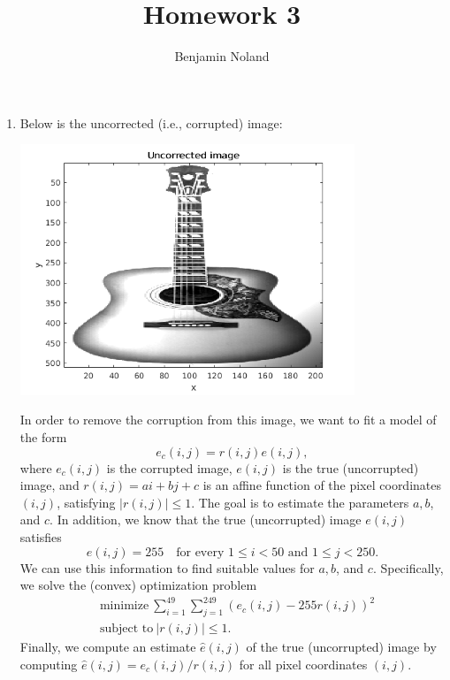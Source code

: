 \documentclass[letterpaper,12pt]{article}
\title{Homework 3}
\author{Benjamin Noland}
\date{}
\begin{document}
\maketitle

\begin{enumerate}
\item Below is the uncorrected (i.e., corrupted) image:
  \begin{center}
    \includegraphics[width=10cm]{corrupted_image.png}
  \end{center}
  In order to remove the corruption from this image, we want to fit a
  model of the form
  \begin{equation*}
    e_c(i, j) = r(i, j) e(i, j),
  \end{equation*}
  where $e_c(i, j)$ is the corrupted image, $e(i, j)$ is the true
  (uncorrupted) image, and $r(i, j) = ai + bj + c$ is an affine
  function of the pixel coordinates $(i, j)$, satisfying
  $|r(i, j)| \leq 1$. The goal is to estimate the parameters $a, b$,
  and $c$. In addition, we know that the true (uncorrupted) image
  $e(i, j)$ satisfies
  \begin{equation*}
    e(i, j) = 255 \quad \text{for every $1 \leq i < 50$ and $1 \leq j < 250$}.
  \end{equation*}
  We can use this information to find suitable values for $a, b$, and
  $c$. Specifically, we solve the (convex) optimization problem
  \begin{align*}
    &\text{minimize} \
      \sum_{i=1}^{49} \sum_{j=1}^{249} (e_c(i, j) - 255 r(i, j))^2 \\
    &\text{subject to} \ |r(i, j)| \leq 1.
  \end{align*}
  Finally, we compute an estimate $\hat{e}(i, j)$ of the true
  (uncorrupted) image by computing
  $\hat{e}(i, j) = e_c(i, j) / r(i, j)$ for all pixel coordinates
  $(i, j)$.


\end{enumerate}
\end{document}
